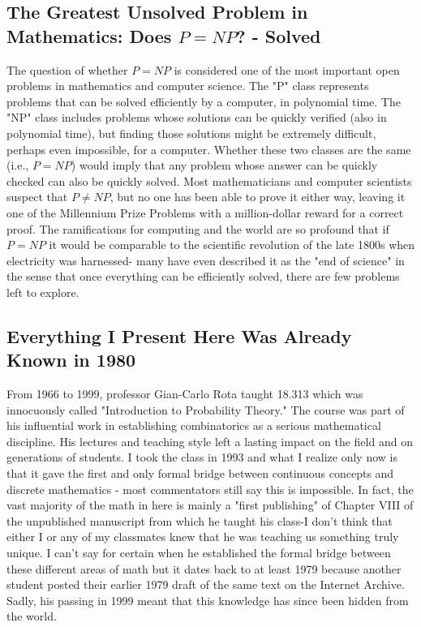 \documentclass{report}
\begin{document}
\subsection*{The Greatest Unsolved Problem in Mathematics: Does $P=NP$? - Solved \checkmark}
The question of whether \(P=NP\) is considered one of the most important open problems in mathematics and computer science. The "P" class represents problems that can be solved efficiently by a computer, in polynomial time. The "NP" class includes problems whose solutions can be quickly verified (also in polynomial time), but finding those solutions might be extremely difficult, perhaps even impossible, for a computer. Whether these two classes are the same (i.e., $P=NP$) would imply that any problem whose answer can be quickly checked can also be quickly solved. Most mathematicians and computer scientists suspect that \(P \neq NP\), but no one has been able to prove it either way, leaving it one of the Millennium Prize Problems with a million-dollar reward for a correct proof. The ramifications for computing and the world are so profound that if \(P=NP\) it would be comparable to the scientific revolution of the late 1800s when electricity was harnessed- many have even described it as the "end of science" in the sense that once everything can be efficiently solved, there are few problems left to explore.

\subsection*{Everything I Present Here Was Already Known in 1980}
From 1966 to 1999, professor Gian-Carlo Rota taught 18.313 which was innocuously called "Introduction to Probability Theory." The course was part of his influential work in establishing combinatorics as a serious mathematical discipline. His lectures and teaching style left a lasting impact on the field and on generations of students. I took the class in 1993 and what I realize only now is that it gave the first and only formal bridge between continuous concepts and discrete mathematics - most commentators still say this is impossible\cite{HossenfelderLorentz2015}. In fact, the vast majority of the math in here is mainly a "first publishing" of Chapter VIII of the unpublished manuscript from which he taught his class-I don't think that either I or any of my classmates knew that he was teaching us something truly unique. I can't say for certain when he established the formal bridge between these different areas of math but it dates back to at least 1979 because another student posted their earlier 1979 draft of the same text on the Internet Archive. Sadly, his passing in 1999 meant that this knowledge has since been hidden from the world.
\end{document}
